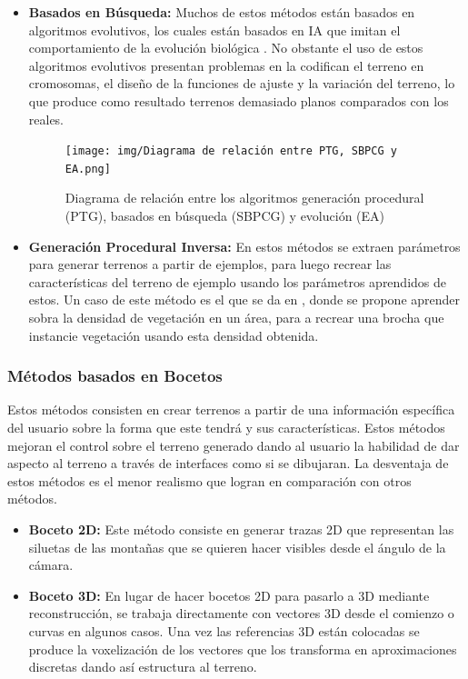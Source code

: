 \begin{itemize}
                \item \textbf{Basados en Búsqueda:} Muchos de estos métodos están basados en algoritmos evolutivos, los cuales están basados en IA que imitan el comportamiento de la evolución biológica \cite{CognizantEvolutionaryAlgorithm}. No obstante el uso de estos algoritmos evolutivos presentan problemas en la codifican el terreno en cromosomas, el diseño de la funciones de ajuste y la variación del terreno, lo que produce como resultado terrenos demasiado planos comparados con los reales. 
                \begin{figure}[h]
                    \centering
                    \texttt{[image: img/Diagrama de relación entre PTG, SBPCG y EA.png]}
                    \caption{Diagrama de relación entre los algoritmos generación procedural (PTG), basados en búsqueda (SBPCG) y evolución (EA)\cite{Raffe2012}}
                \end{figure}\newpage

                \item \textbf{Generación Procedural Inversa:} En estos métodos se extraen parámetros para generar terrenos a partir de ejemplos, para luego recrear las características del terreno de ejemplo usando los parámetros aprendidos de estos. Un caso de este método es el que se da en \cite{Emilien2015}, donde se propone aprender sobra la densidad de vegetación en un área, para a recrear una brocha que instancie vegetación usando esta densidad obtenida.
            \end{itemize}

        \subsubsection{Métodos basados en Bocetos}
        Estos métodos consisten en crear terrenos a partir de una información específica del usuario sobre la forma que este tendrá y sus características. Estos métodos mejoran el control sobre el terreno generado dando al usuario la habilidad de dar aspecto al terreno a través de interfaces como si se dibujaran. La desventaja de estos métodos es el menor realismo que logran en comparación con otros métodos.
            \begin{itemize}
                \item \textbf{Boceto 2D:} Este método consiste en generar trazas 2D que representan las siluetas de las montañas que se quieren hacer visibles desde el ángulo de la cámara. 
                \item \textbf{Boceto 3D:} En lugar de hacer bocetos 2D para pasarlo a 3D mediante reconstrucción, se trabaja directamente con vectores 3D desde el comienzo o curvas en algunos casos. Una vez las referencias 3D están colocadas se produce la voxelización de los vectores que los transforma en aproximaciones discretas dando así estructura al terreno.
            \end{itemize}


